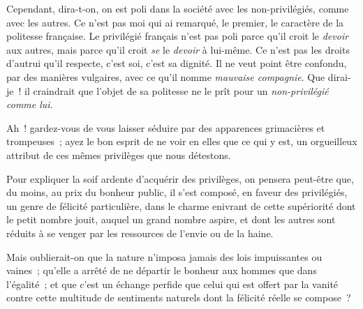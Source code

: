\documentclass[french,twoside]{book} %
\begin{document}
Cependant, dira-t-on, on est poli dans la société avec les non-privilégiés, comme avec les autres. Ce n’est pas moi qui ai remarqué, le premier, le caractère de la politesse française. Le privilégié français n’est pas poli parce qu’il croit le {\itshape devoir} aux autres, mais parce qu’il croit {\itshape se} le {\itshape devoir} à lui-même. Ce n’est pas les droits d’autrui qu’il respecte, c’est soi, c’est sa dignité. Il ne veut point être confondu, par des manières vulgaires, avec ce qu’il nomme {\itshape mauvaise compagnie}. Que dirai-je ! il craindrait que l’objet de sa politesse ne le prît pour un {\itshape non-privilégié comme lui}.\par
Ah ! gardez-vous de vous laisser séduire par des apparences grimacières et trompeuses ; ayez le bon esprit de ne voir en elles que ce qui y est, un orgueilleux attribut de ces mêmes privilèges que nous détestons.\par
Pour expliquer la soif ardente d’acquérir des privilèges, on pensera peut-être que, du moins, au prix du bonheur public, il s’est composé, en faveur des privilégiés, un genre de félicité particulière, dans le charme enivrant de cette supériorité dont le petit nombre jouit, auquel un grand nombre aspire, et dont les autres sont réduits à se venger par les ressources de l’envie ou de la haine.\par
Mais oublierait-on que la nature n’imposa jamais des lois impuissantes ou vaines ; qu’elle a arrêté de ne départir le bonheur aux hommes que dans l’égalité ; et que c’est un échange perfide que celui qui est offert par la vanité contre cette multitude de sentiments naturels dont la félicité réelle se compose ?\par
\end{document}
